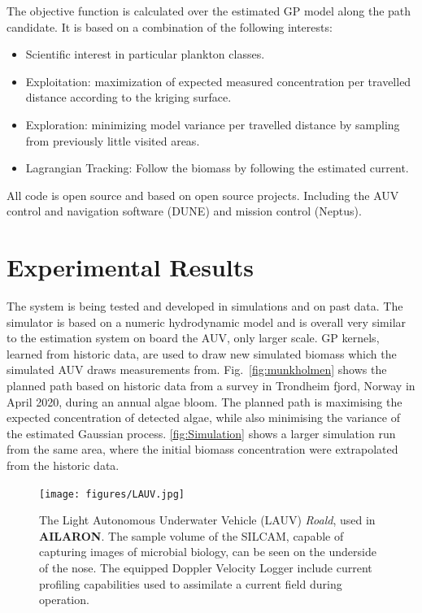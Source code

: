 \documentclass[conference]{IEEEtran}
\def\proje{{\textbf{AILARON}}}
\newcommand{\cmt}[1]{{\color{red}{#1}}}
\begin{document}
The objective function is calculated over the estimated GP model along
the path candidate. It is based on a combination of the following
interests:

\begin{itemize}
    \item Scientific interest in particular plankton classes. 
    \item Exploitation: maximization of expected measured concentration per travelled distance
      according to the kriging surface. 
    \item Exploration: minimizing model variance per travelled distance by sampling from
      previously little visited areas.
    \item Lagrangian Tracking: Follow the biomass by following the estimated current.
\end{itemize}
All code is open source and based on open source projects. Including
the AUV control and navigation software (DUNE) and mission control
(Neptus)\cite{pinto2013lsts}.

\section{Experimental Results}

The system is being tested and developed in simulations and on past
data.  The simulator is based on a numeric hydrodynamic model and is
overall very similar to the estimation system on board the AUV, only
larger scale.  GP kernels, learned from historic data, are used to
draw new simulated biomass which the simulated AUV draws measurements
from.  Fig.~\ref{fig:munkholmen} shows the planned path based on
historic data from a survey in Trondheim fjord, Norway in April 2020,
during an annual algae bloom. The planned path is maximising the
expected concentration of detected algae, while also minimising the
variance of the estimated Gaussian process.  \cref{fig:Simulation}
shows a larger simulation run from the same area, where the initial
biomass concentration were extrapolated from the historic data.

\begin{figure}[tbp]
  \centering
  \texttt{[image: figures/LAUV.jpg]}
  \caption{The Light Autonomous Underwater Vehicle (LAUV)
    \emph{Roald}, used in \proje. The sample volume of the SILCAM,
    capable of capturing images of microbial biology, can be seen on
    the underside of the nose. The equipped Doppler Velocity Logger
    include current profiling capabilities used to assimilate a
    current field during operation.}
  \label{fig:roald}
\end{figure}
\end{document}
